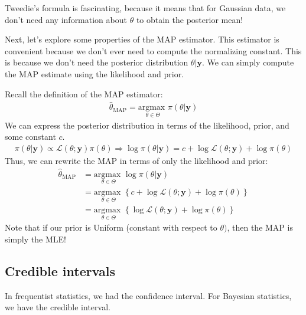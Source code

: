 \documentclass[12pt]{article}
\begin{document}
\medskip

\noindent Tweedie's formula is fascinating, because it means that for Gaussian data, we don't need any information about $\theta$ to obtain the posterior mean! 

\medskip

\noindent Next, let's explore some properties of the MAP estimator. This estimator is convenient because we don't ever need to compute the normalizing constant. This is because we don't need the posterior distribution $\theta|\textbf{y}$. We can simply compute the MAP estimate using the likelihood and prior.

\medskip

\begin{tcolorbox}[breakable, title = \textbf{Remark}: Properties of the MAP estimator] 
    Recall the definition of the MAP estimator:
    \begin{align*}
        \hat\theta_\text{MAP} = \underset{\theta \in \Theta}{\text{argmax }}\pi(\theta|\textbf{y})
    \end{align*}
    We can express the posterior distribution in terms of the likelihood, prior, and some constant $c$.
    \begin{align*}
        \pi(\theta|\textbf{y}) \propto \mathcal{L}(\theta;\textbf{y})\pi(\theta) \Rightarrow\log\pi(\theta|\textbf{y}) = c + \log \mathcal{L}(\theta;\textbf{y}) + \log \pi(\theta)
    \end{align*}
    Thus, we can rewrite the MAP in terms of only the likelihood and prior:
    \begin{align*}
        \hat\theta_\text{MAP} 
        &= \underset{\theta \in \Theta}{\text{argmax }}\log \pi(\theta|\textbf{y})\\
        &=  \underset{\theta \in \Theta}{\text{argmax }} \left\{c + \log \mathcal{L}(\theta;\textbf{y}) + \log \pi(\theta)\right\}\\
        &= \underset{\theta \in \Theta}{\text{argmax }} \left\{\log \mathcal{L}(\theta;\textbf{y}) + \log \pi(\theta)\right\}
    \end{align*}
    Note that if our prior is Uniform (constant with respect to $\theta) $, then the MAP is simply the MLE!
\end{tcolorbox}

\subsection{Credible intervals}

\noindent In frequentist statistics, we had the confidence interval. For Bayesian statistics, we have the credible interval. 
\end{document}
